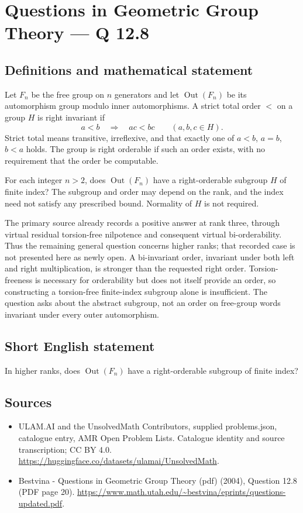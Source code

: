 \documentclass[11pt,a4paper]{article}
\begin{document}
\section*{Questions in Geometric Group Theory — Q 12.8}\label{statement}

\subsection{Definitions and mathematical statement}
Let $F_n$ be the free group on $n$ generators and let $\operatorname{Out}(F_n)$ be its automorphism group modulo inner automorphisms. A strict total order $<$ on a group $H$ is right invariant if
\[
 a<b\quad\Longrightarrow\quad ac<bc
       \qquad(a,b,c\in H).
\]
Strict total means transitive, irreflexive, and that exactly one of $a<b$, $a=b$, $b<a$ holds. The group is right orderable if such an order exists, with no requirement that the order be computable.

For each integer $n>2$, does $\operatorname{Out}(F_n)$ have a right-orderable subgroup $H$ of finite index? The subgroup and order may depend on the rank, and the index need not satisfy any prescribed bound. Normality of $H$ is not required.

The primary source already records a positive answer at rank three, through virtual residual torsion-free nilpotence and consequent virtual bi-orderability. Thus the remaining general question concerns higher ranks; that recorded case is not presented here as newly open. A bi-invariant order, invariant under both left and right multiplication, is stronger than the requested right order. Torsion-freeness is necessary for orderability but does not itself provide an order, so constructing a torsion-free finite-index subgroup alone is insufficient. The question asks about the abstract subgroup, not an order on free-group words invariant under every outer automorphism.
\subsection{Short English statement}
In higher ranks, does $\operatorname{Out}(F_n)$ have a right-orderable subgroup of finite index?
\subsection{Sources}
\begin{itemize}
\item[S1] ULAM.AI and the UnsolvedMath Contributors, supplied problems.json, catalogue entry, AMR Open Problem Lists. Catalogue identity and source transcription; CC BY 4.0.
\url{https://huggingface.co/datasets/ulamai/UnsolvedMath}.
\item[S2] Bestvina - Questions in Geometric Group Theory (pdf) (2004), Question 12.8 (PDF page 20). 
\url{https://www.math.utah.edu/~bestvina/eprints/questions-updated.pdf}.
\end{itemize}
\end{document}
